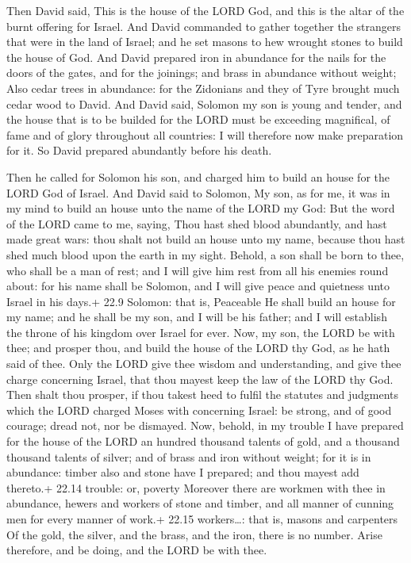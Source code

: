  Then David said, This is the house of the LORD God, and
this is the altar of the burnt offering for Israel.  And
David commanded to gather together the strangers that were in the land
of Israel; and he set masons to hew wrought stones to build the house of
God.  And David prepared iron in abundance for the nails for
the doors of the gates, and for the joinings; and brass in abundance
without weight;  Also cedar trees in abundance: for the
Zidonians and they of Tyre brought much cedar wood to David.
 And David said, Solomon my son is young and tender, and the
house that is to be builded for the LORD must be exceeding magnifical,
of fame and of glory throughout all countries: I will therefore now make
preparation for it. So David prepared abundantly before his death.

 Then he called for Solomon his son, and charged him to
build an house for the LORD God of Israel.  And David said
to Solomon, My son, as for me, it was in my mind to build an house unto
the name of the LORD my God:  But the word of the LORD came
to me, saying, Thou hast shed blood abundantly, and hast made great
wars: thou shalt not build an house unto my name, because thou hast shed
much blood upon the earth in my sight.  Behold, a son shall
be born to thee, who shall be a man of rest; and I will give him rest
from all his enemies round about: for his name shall be Solomon, and I
will give peace and quietness unto Israel in his days.+ 22.9 Solomon:
that is, Peaceable  He shall build an house for my name;
and he shall be my son, and I will be his father; and I will establish
the throne of his kingdom over Israel for ever.  Now, my
son, the LORD be with thee; and prosper thou, and build the house of the
LORD thy God, as he hath said of thee.  Only the LORD give
thee wisdom and understanding, and give thee charge concerning Israel,
that thou mayest keep the law of the LORD thy God.  Then
shalt thou prosper, if thou takest heed to fulfil the statutes and
judgments which the LORD charged Moses with concerning Israel: be
strong, and of good courage; dread not, nor be dismayed. 
Now, behold, in my trouble I have prepared for the house of the LORD an
hundred thousand talents of gold, and a thousand thousand talents of
silver; and of brass and iron without weight; for it is in abundance:
timber also and stone have I prepared; and thou mayest add thereto.+
22.14 trouble: or, poverty  Moreover there are workmen with
thee in abundance, hewers and workers of stone and timber, and all
manner of cunning men for every manner of work.+ 22.15 workers\ldots:
that is, masons and carpenters  Of the gold, the silver,
and the brass, and the iron, there is no number. Arise therefore, and be
doing, and the LORD be with thee.

